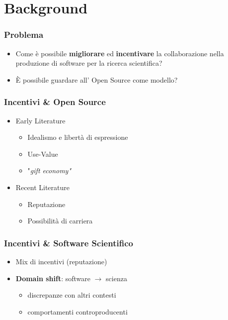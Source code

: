 \section{Background}

\begin{frame}\frametitle{Problema}

\begin{itemize}[<+->]
\item
  Come è possibile \textbf{migliorare} ed \textbf{incentivare} la
  collaborazione nella produzione di software per la ricerca
  scientifica?
\item
  È possibile guardare all' Open Source come modello?
\end{itemize}

\end{frame}

\begin{frame}\frametitle{Incentivi \& Open Source}

\begin{itemize}[<+->]
\itemsep1pt\parskip0pt
\item
  Early Literature

  \begin{itemize}[<+->]
  \itemsep1pt\parskip0pt
  \item
    Idealismo e libertà di espressione
  \item
    Use-Value
  \item
    "\em{gift economy}"
  \end{itemize}
\item
  Recent Literature

  \begin{itemize}[<+->]
  \itemsep1pt\parskip0pt
  \item
    Reputazione
  \item
    Possibilità di carriera
  \end{itemize}
\end{itemize}

\end{frame}

\begin{frame}\frametitle{Incentivi \& Software Scientifico}

\begin{itemize}[<+->]
\itemsep1pt\parskip0pt
\item
  Mix di incentivi (reputazione)
\item
  \textbf{Domain shift}: software $\rightarrow$ scienza

  \begin{itemize}[<+->]
  \itemsep1pt\parskip0pt
  \item
    discrepanze con altri contesti
  \item
    comportamenti controproducenti
  \end{itemize}
\end{itemize}

\end{frame}


